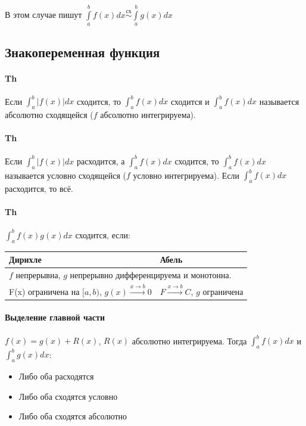 \documentclass{article}
\newcommand{\x}{\text}
\begin{document}
В этом случае пишут $\int\limits_a^b f(x)dx \mathop{\sim}\limits^{\mathrm{\x{сх}}}\int\limits_a^bg(x) dx$
\subsection{Знакопеременная функция}
\paragraph*{Th} Если $\int_a^b |f(x)|dx$ сходится, то $\int_a^b f(x)dx $ сходится и $\int_a^b f(x)dx $ называется абсолютно сходящейся ($f$ абсолютно интегрируема).
\paragraph*{Th} Если $\int_a^b |f(x)|dx $ расходится, а $\int_a^b f(x)dx $ сходится, то $\int_a^b f(x) dx $ называется условно сходящейся ($f$ условно интегрируема). Если $\int_a^b f(x)dx $ расходится, то всё.
\newpage
\paragraph*{Th} $\int_a^bf(x)g(x)dx$ сходится, если:
\begin{table}[h!]
    \centering
    \begin{tabular}{|ll|}
        \hline
        \multicolumn{1}{|l|}{Дирихле}                                                   & Абель                                      \\ \hline
        \multicolumn{2}{|l|}{$f$ непрерывна, $g$ непрерывно дифференцируема и монотонна.}                                            \\ \hline
        \multicolumn{1}{|l|}{F(x) ограничена на $[a,b)$, $g(x)\xrightarrow{x\to  b} 0$} & $F \xrightarrow{x\to b} C$, $g$ ограничена \\ \hline
    \end{tabular}
\end{table}
\paragraph*{Выделение главной части} $f(x) = g(x) + R(x)$, $R(x)$ абсолютно интегрируема. Тогда $\int_a^b f(x)dx $ и $\int_a^bg(x)dx$:
\begin{itemize}
    \item Либо оба расходятся
    \item Либо оба сходятся условно
    \item Либо оба сходятся абсолютно
\end{itemize}
\end{document}
